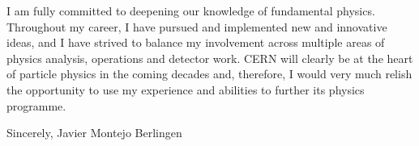 \documentclass[11pt,a4paper,sans]{moderncv}        %
\begin{document}
I am fully committed to deepening our knowledge of fundamental physics.
Throughout my career, I have pursued and implemented new and innovative ideas, and I have strived to balance my involvement across multiple areas of physics analysis, operations and detector work. 
CERN will clearly be at the heart of particle physics in the coming decades and, therefore, I would very much relish the opportunity to use my experience and abilities to further its physics programme.
\newline


Sincerely,
\newline
\newline
\newline
Javier Montejo Berlingen
\end{document}
